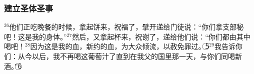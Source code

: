 \subsubsection{建立圣体圣事}
$^{26}$他们正吃晚餐的时候，\UL[耶稣]拿起饼来，祝福了，擘开递给门徒说：“你们拿支部秘吧！这是我的身体。”$^{27}$然后，又拿起杯来，祝谢了，递给他们说：“你们都由其中喝吧！$^{28}$因为这是我的血，新约的血，为大众倾流，以赦免罪过。\textcircled{5}$^{29}$我告诉你们：从今以后，我不再喝这葡萄汁了直到在我父的国里那一天，与你们同喝新酒。”\textcircled{6}